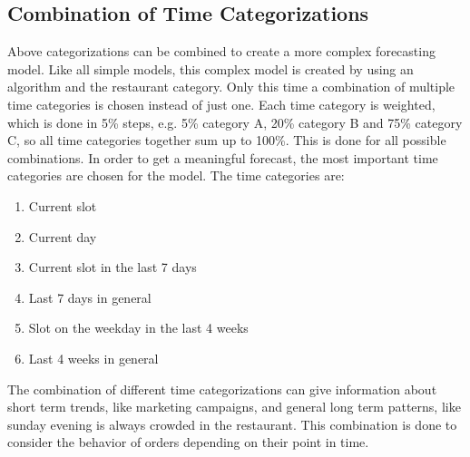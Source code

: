 \subsection{Combination of Time Categorizations}\label{subsection:Categorizing by Order}
Above categorizations can be combined to create a more complex forecasting model. Like all simple models, this complex model is created by using an algorithm and the restaurant category. Only this time a combination of multiple time categories is chosen instead of just one. Each time category is weighted, which is done in 5\% steps, e.g. 5\% category A, 20\% category B and 75\% category C, so all time categories together sum up to 100\%.  This is done for all possible combinations. In order to get a meaningful forecast, the most important time categories are chosen for the model. The time categories are:
\begin{enumerate}
\item Current slot
\item Current day
\item Current slot in the last 7 days
\item Last 7 days in general
\item Slot on the weekday in the last 4 weeks
\item Last 4 weeks in general
\end{enumerate}

The combination of different time categorizations can give information about short term trends, like marketing campaigns, and general long term patterns, like sunday evening is always crowded in the restaurant.\newline
This combination is done to consider the behavior of orders depending on their point in time.
